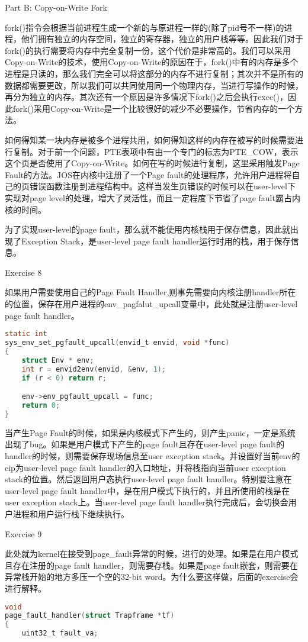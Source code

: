 \documentclass[GBK,winfonts,a4paper,10pt]{ctexart}
\begin{document}
\begin{section}{Part B: Copy-on-Write Fork}
\par
fork()指令会根据当前进程生成一个新的与原进程一样的(除了pid号不一样)的进程，他们拥有独立的内存空间，独立的寄存器，独立的用户栈等等。因此我们对于fork()的执行需要将内存中完全复制一份，这个代价是非常高的。我们可以采用Copy-on-Write的技术，使用Copy-on-Write的原因在于，fork()中有的内存是多个进程是只读的，那么我们完全可以将这部分的内存不进行复制；其次并不是所有的数据都需要更改，所以我们可以共同使用同一个物理内存，当进行写操作的时候，再分为独立的内存。其次还有一个原因是许多情况下fork()之后会执行exec()，因此fork()采用Copy-on-Write是一个比较很好的减少不必要操作，节省内存的一个方法。
\par
如何得知某一块内存是被多个进程共用，如何得知这样的内存在被写的时候需要进行复制。对于前一个问题，PTE表项中有由一个专门的标志为PTE\_COW，表示这个页是否使用了Copy-on-Write。如何在写的时候进行复制，这里采用触发Page Fault的方法。JOS在内核中注册了一个Page fault的处理程序，允许用户进程将自己的页错误函数注册到进程结构中。这样当发生页错误的时候可以在user-level下实现对page level的处理，增大了灵活性，而且一定程度下节省了page fault霸占内核的时间。
\par
为了实现user-level的page fault，那么就不能使用内核栈用于保存信息，因此就出现了Exception Stack，是user-level page fault handler运行时用的栈，用于保存信息。

\begin{subsection}{Exercise 8}
\par
如果用户需要使用自己的Page Fault Handler,则事先需要向内核注册handler所在的位置，保存在用户进程的env\_pagfalut\_upcall变量中，此处就是注册user-level page fault handler。
\begin{lstlisting}[language=C]
static int
sys_env_set_pgfault_upcall(envid_t envid, void *func)
{
	struct Env * env;
	int r = envid2env(envid, &env, 1);
	if (r < 0) return r;

	env->env_pgfault_upcall = func;
	return 0;
}
\end{lstlisting}
\end{subsection}

\par
当产生Page Fault的时候，如果是内核模式下产生的，则产生panic，一定是系统出现了bug。如果是用户模式下产生的page fault且存在user-level page fault的handler的时候，则需要保存现场信息至user exception stack。并设置好当前env的eip为user-level page fault handler的入口地址，并将栈指向当前user exception stack的位置。然后返回用户态执行user-level page fault handler。特别要注意在user-level page fault handler中，是在用户模式下执行的，并且所使用的栈是在user exception stack上。当user-level page fault handler执行完成后，会切换会用户进程和用户运行栈下继续执行。
\begin{subsection}{Exercise 9}
\par
此处就为kernel在接受到page\_fault异常的时候，进行的处理。如果是在用户模式且存在注册的page fault handler，则需要存栈。如果是page fault嵌套，则需要在异常栈开始的地方多压一个空的32-bit word。为什么要这样做，后面的exercise会进行解释。
\begin{lstlisting}[language=C]
void
page_fault_handler(struct Trapframe *tf)
{
	uint32_t fault_va;


\end{lstlisting}
\end{subsection}
\end{section}
\end{document}
